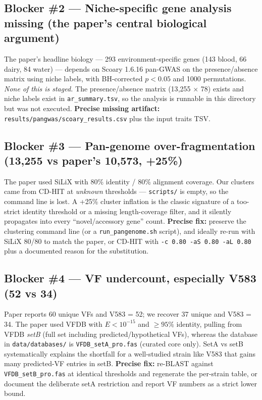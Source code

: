 \documentclass[11pt]{article}
\begin{document}
\subsection*{Blocker \#2 --- Niche-specific gene analysis missing (the paper's central biological argument)}
The paper's headline biology --- 293 environment-specific genes (143 blood, 66 dairy, 84 water) --- depends on Scoary 1.6.16 pan-GWAS on the presence/absence matrix using niche labels, with BH-corrected $p<0.05$ and 1000 permutations. \emph{None of this is staged.} The presence/absence matrix (13{,}255 $\times$ 78) exists and niche labels exist in \texttt{ar\_summary.tsv}, so the analysis is runnable in this directory but was not executed. \textbf{Precise missing artifact:} \texttt{results/pangwas/scoary\_results.csv} plus the input traits TSV.

\subsection*{Blocker \#3 --- Pan-genome over-fragmentation (13{,}255 vs paper's 10{,}573, +25\%)}
The paper used SiLiX with 80\% identity / 80\% alignment coverage. Our clusters came from CD-HIT at \emph{unknown} thresholds --- \texttt{scripts/} is empty, so the command line is lost. A +25\% cluster inflation is the classic signature of a too-strict identity threshold or a missing length-coverage filter, and it silently propagates into every ``novel/accessory gene'' count. \textbf{Precise fix:} preserve the clustering command line (or a \texttt{run\_pangenome.sh} script), and ideally re-run with SiLiX 80/80 to match the paper, or CD-HIT with \texttt{-c 0.80 -aS 0.80 -aL 0.80} plus a documented reason for the substitution.

\subsection*{Blocker \#4 --- VF undercount, especially V583 (52 vs 34)}
Paper reports 60 unique VFs and V583 = 52; we recover 37 unique and V583 = 34. The paper used VFDB with $E<10^{-15}$ and $\geq 95\%$ identity, pulling from VFDB \emph{setB} (full set including predicted/hypothetical VFs), whereas the database in \texttt{data/databases/} is \texttt{VFDB\_setA\_pro.fas} (curated core only). SetA vs setB systematically explains the shortfall for a well-studied strain like V583 that gains many predicted-VF entries in setB. \textbf{Precise fix:} re-BLAST against \texttt{VFDB\_setB\_pro.fas} at identical thresholds and regenerate the per-strain table, or document the deliberate setA restriction and report VF numbers as a strict lower bound.
\end{document}
